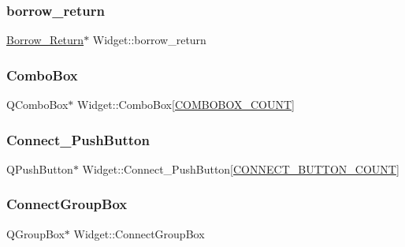 \subsubsection{\texorpdfstring{borrow\_return}{borrow\_return}}
{\footnotesize\ttfamily \mbox{\hyperlink{class_borrow___return}{Borrow\+\_\+\+Return}}$\ast$ Widget\+::borrow\+\_\+return\hspace{0.3cm}{\ttfamily [private]}}

\mbox{\label{class_widget_aa4932b7d383548bd1c3ef9fdc53b77b3}} 
\subsubsection{\texorpdfstring{ComboBox}{ComboBox}}
{\footnotesize\ttfamily Q\+Combo\+Box$\ast$ Widget\+::\+Combo\+Box\mbox{[}\mbox{\hyperlink{widget_8h_a1d2dbe60aded23affb089e8fa1ea345f}{C\+O\+M\+B\+O\+B\+O\+X\+\_\+\+C\+O\+U\+NT}}\mbox{]}\hspace{0.3cm}{\ttfamily [private]}}

\mbox{\label{class_widget_a61a0fc24c1e493f10809a38be1672b2f}} 
\subsubsection{\texorpdfstring{Connect\_PushButton}{Connect\_PushButton}}
{\footnotesize\ttfamily Q\+Push\+Button$\ast$ Widget\+::\+Connect\+\_\+\+Push\+Button\mbox{[}\mbox{\hyperlink{widget_8h_a8c7377d6ed6b5f2e3d196cda9bd66d91}{C\+O\+N\+N\+E\+C\+T\+\_\+\+B\+U\+T\+T\+O\+N\+\_\+\+C\+O\+U\+NT}}\mbox{]}\hspace{0.3cm}{\ttfamily [private]}}

\mbox{\label{class_widget_a51813d6ac9183c588f40b130d4e54cc9}} 
\subsubsection{\texorpdfstring{ConnectGroupBox}{ConnectGroupBox}}
{\footnotesize\ttfamily Q\+Group\+Box$\ast$ Widget\+::\+Connect\+Group\+Box\hspace{0.3cm}{\ttfamily [private]}}

